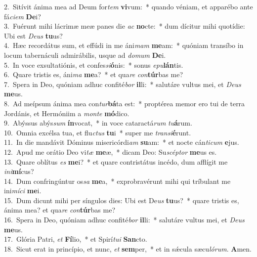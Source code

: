 {2.~}Sitívit ánima mea ad Deum for\textit{tem} \textbf{vi}vum:~* quando véniam, et apparébo ante fá\textit{ci}\textit{em} \textbf{De}i?\\
{3.~}Fuérunt mihi lácrimæ meæ panes die \textit{ac} \textbf{no}cte:~* dum dícitur mihi quotídie: Ubi est \textit{De}\textit{us} \textbf{tu}us?\\
{4.~}Hæc recordátus sum, et effúdi in me áni\textit{mam} \textbf{me}am:~* quóniam transíbo in locum tabernáculi admirábilis, usque ad \textit{do}\textit{mum} \textbf{De}i.\\
{5.~}In voce exsultatiónis, et confes\textit{si}\textbf{ó}nis:~* sonus \textit{e}\textit{pu}\textbf{lán}tis.\\
{6.~}Quare tristis es, áni\textit{ma} \textbf{me}a?~* et qua\textit{re} \textit{con}\textbf{túr}bas me?\\
{7.~}Spera in Deo, quóniam adhuc confité\textit{bor} \textbf{il}li:~* salutáre vultus mei, et \textit{De}\textit{us} \textbf{me}us.\\
{8.~}Ad meípsum ánima mea con\textit{tur}\textbf{bá}ta est:~* proptérea memor ero tui de terra Jordánis, et Hermóniim a \textit{mon}\textit{te} \textbf{mó}dico.\\
{9.~}Abýssus abýs\textit{sum} \textbf{ín}vocat,~* in voce cataractá\textit{rum} \textit{tu}\textbf{á}rum.\\
{10.~}Omnia excélsa tua, et flu\textit{ctus} \textbf{tu}i~* super me \textit{tran}\textit{si}\textbf{é}runt.\\
{11.~}In die mandávit Dóminus misericórdi\textit{am} \textbf{su}am:~* et nocte cán\textit{ti}\textit{cum} \textbf{e}jus.\\
{12.~}Apud me orátio Deo vi\textit{tæ} \textbf{me}æ,~* dicam Deo: Su\textit{scép}\textit{tor} \textbf{me}us es.\\
{13.~}Quare oblítus \textit{es} \textbf{me}i?~* et quare contristátus incédo, dum afflígit me \textit{i}\textit{ni}\textbf{mí}cus?\\
{14.~}Dum confringúntur os\textit{sa} \textbf{me}a,~* exprobravérunt mihi qui tríbulant me ini\textit{mí}\textit{ci} \textbf{me}i.\\
{15.~}Dum dicunt mihi per síngulos dies: Ubi est De\textit{us} \textbf{tu}us?~* quare tristis es, ánima mea? et qua\textit{re} \textit{con}\textbf{túr}bas me?\\
{16.~}Spera in Deo, quóniam adhuc confité\textit{bor} \textbf{il}li:~* salutáre vultus mei, et \textit{De}\textit{us} \textbf{me}us.\\
{17.~}Glória Patri, \textit{et} \textbf{Fí}lio,~* et Spirí\textit{tu}\textit{i} \textbf{San}cto.\\
{18.~}Sicut erat in princípio, et nunc, \textit{et} \textbf{sem}per,~* et in sǽcula sæcu\textit{ló}\textit{rum}. \textbf{A}men.\\
